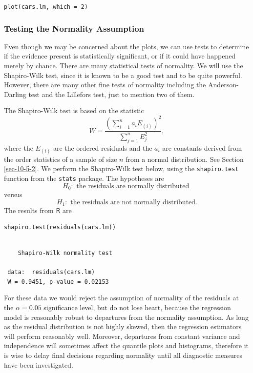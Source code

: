 \documentclass[captions=tableheading]{scrbook}
\begin{document}
\begin{verbatim}
plot(cars.lm, which = 2)
\end{verbatim}
\subsubsection{Testing the Normality Assumption}
\label{sec-11-4-1-1}


Even though we may be concerned about the plots, we can use tests to determine if the evidence present is statistically significant, or if it could have happened merely by chance. There are many statistical tests of normality. We will use the Shapiro-Wilk test, since it is known to be a good test and to be quite powerful. However, there are many other fine tests of normality including the Anderson-Darling test and the Lillefors test, just to mention two of them.  

The Shapiro-Wilk test is based on the statistic
\begin{equation}
W=\frac{\left(\sum_{i=1}^{n}a_{i}E_{(i)}\right)^{2}}{\sum_{j=1}^{n}E_{j}^{2}},
\end{equation}
where the \(E_{(i)}\) are the ordered residuals and the \(a_{i}\) are constants derived from the order statistics of a sample of size \(n\) from a normal distribution. See Section \ref{sec-10-5-2}.
We perform the Shapiro-Wilk test below, using the \texttt{shapiro.test} function from the \texttt{stats} package. The hypotheses are
\[
H_{0}:\mbox{ the residuals are normally distributed }
\]
versus
\[
H_{1}:\mbox{ the residuals are not normally distributed.}
\]
The results from \(\mathsf{R}\) are


\begin{verbatim}
shapiro.test(residuals(cars.lm))
\end{verbatim}

\begin{verbatim}
 
 	Shapiro-Wilk normality test
 
 data:  residuals(cars.lm) 
 W = 0.9451, p-value = 0.02153
\end{verbatim}

For these data we would reject the assumption of normality of the residuals at the \(\alpha=0.05\) significance level, but do not lose heart, because the regression model is reasonably robust to departures from the normality assumption. As long as the residual distribution is not highly skewed, then the regression estimators will perform reasonably well. Moreover, departures from constant variance and independence will sometimes affect the quantile plots and histograms, therefore it is wise to delay final decisions regarding normality until all diagnostic measures have been investigated.
\end{document}
